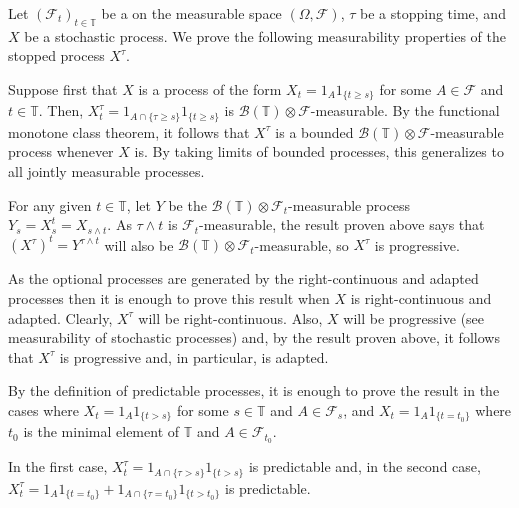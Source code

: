 \documentclass[12pt]{article}
\begin{document}

Let $(\mathcal{F}_t)_{t\in\mathbb{T}}$ be a  on the measurable space $(\Omega,\mathcal{F})$, $\tau$ be a stopping time, and $X$ be a stochastic process. We prove the following measurability properties of the stopped process $X^\tau$.

\vspace{\baselineskip}
\par Suppose first that $X$ is a process of the form $X_t=1_A1_{\{t\ge s\}}$ for some $A\in\mathcal{F}$ and $t\in\mathbb{T}$. Then, $X^\tau_t=1_{A\cap\{\tau\ge s\}}1_{\{t\ge s\}}$ is $\mathcal{B}(\mathbb{T})\otimes\mathcal{F}$-measurable. By the functional monotone class theorem, it follows that $X^\tau$ is a bounded $\mathcal{B}(\mathbb{T})\otimes\mathcal{F}$-measurable process whenever $X$ is. By taking limits of bounded processes, this generalizes to all jointly measurable processes.

\vspace{\baselineskip}
\par For any given $t\in\mathbb{T}$, let $Y$ be the $\mathcal{B}(\mathbb{T})\otimes\mathcal{F}_t$-measurable process $Y_s= X^t_s=X_{s\wedge t}$. As $\tau\wedge t$ is $\mathcal{F}_t$-measurable, the result proven above says that $(X^\tau)^t=Y^{\tau\wedge t}$ will also be $\mathcal{B}(\mathbb{T})\otimes\mathcal{F}_t$-measurable, so $X^\tau$ is progressive.

\vspace{\baselineskip}
\par As the optional processes are generated by the right-continuous and adapted processes then it is enough to prove this result when $X$ is right-continuous and adapted. Clearly, $X^\tau$ will be right-continuous. Also, $X$ will be progressive (see measurability of stochastic processes) and, by the result proven above, it follows that $X^\tau$ is progressive and, in particular, is adapted.

\vspace{\baselineskip}
\par By the definition of predictable processes, it is enough to prove the result in the cases where $X_t=1_A1_{\{t>s\}}$ for some $s\in\mathbb{T}$ and $A\in\mathcal{F}_s$, and $X_t=1_A1_{\{t=t_0\}}$ where $t_0$ is the minimal element of $\mathbb{T}$ and $A\in\mathcal{F}_{t_0}$.

In the first case, $X^\tau_t=1_{A\cap\{\tau>s\}}1_{\{t>s\}}$ is predictable and, in the second case, $X^\tau_t=1_{A}1_{\{t=t_0\}}+1_{A\cap\{\tau=t_0\}}1_{\{t>t_0\}}$ is predictable.

\end{document}
